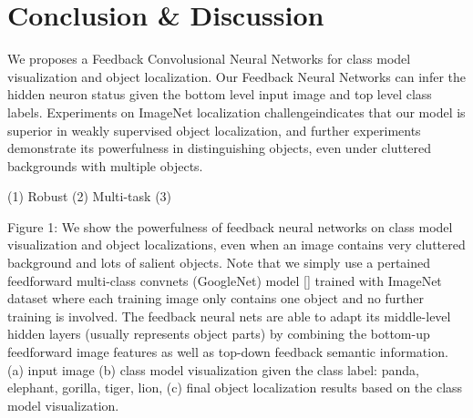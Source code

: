 \section{Conclusion \& Discussion}
\label{sec:conclusion}

We proposes a Feedback Convolusional Neural Networks for class model visualization and object localization.
Our Feedback Neural Networks can infer the hidden neuron status given the bottom level input image and top level class labels.
Experiments on ImageNet localization challengeindicates that our model is superior in weakly supervised object localization, and further experiments demonstrate its powerfulness in distinguishing objects, even under cluttered backgrounds with multiple objects.

(1) Robust
(2) Multi-task
(3)

Figure 1: We show the powerfulness of feedback neural networks on class model visualization and object localizations, even when an image contains very cluttered background and lots of salient objects. Note that we simply use a pertained feedforward multi-class convnets (GoogleNet) model [] trained with ImageNet dataset where each training image only contains one object and no further training is involved. The feedback neural nets are able to adapt its middle-level hidden layers (usually represents object parts) by combining the bottom-up feedforward image features as well as top-down feedback semantic information. (a) input image (b) class model visualization given the class label: panda, elephant, gorilla, tiger, lion, (c) final object localization results based on the class model visualization.
